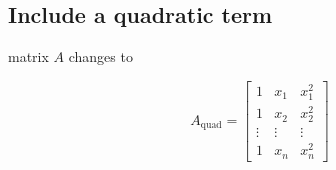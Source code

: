 \documentclass{article}
\begin{document}
\subsection{Include a quadratic term}\label{include-a-quadratic-term}

matrix $A$ changes to

\begin{equation}
A_{\mathrm{quad}} = 
\begin{bmatrix}
1&x_1&x_1^2\\
1&x_2&x_2^2\\
\vdots&\vdots&\vdots\\
1&x_n&x_n^2
\end{bmatrix}
\end{equation}

\end{document}
